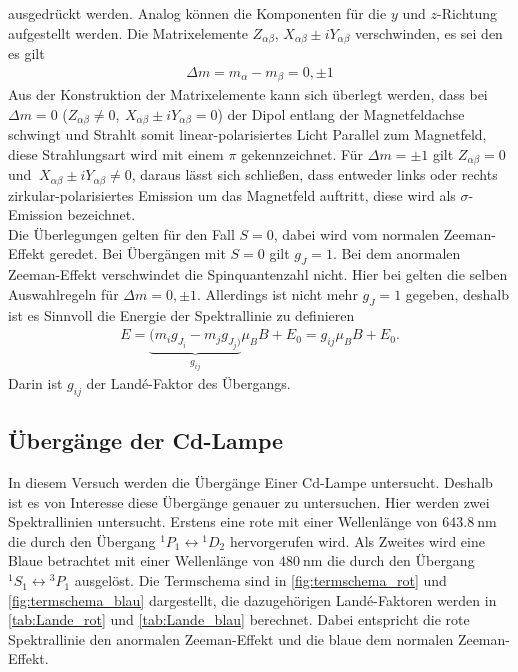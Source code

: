 ausgedrückt werden.
Analog können die Komponenten für die $y$ und $z$-Richtung aufgestellt werden.
Die Matrixelemente $Z_{\alpha\beta}$, $X_{\alpha\beta}\pm i Y_{\alpha\beta}$ verschwinden, es sei den es gilt
\begin{align}
	\Delta m = m_\alpha-m_\beta = 0,\pm1
\end{align}
Aus der Konstruktion der Matrixelemente kann sich überlegt werden, dass bei $\Delta m=0$ ($Z_{\alpha\beta}\not=0,\ X_{\alpha\beta}\pm i Y_{\alpha\beta}=0$) der Dipol entlang der Magnetfeldachse schwingt und Strahlt somit linear-polarisiertes Licht Parallel zum Magnetfeld, diese Strahlungsart wird mit einem $\pi$ gekennzeichnet.
Für $\Delta m =\pm1$ gilt $Z_{\alpha\beta}=0$ und $\ X_{\alpha\beta}\pm i Y_{\alpha\beta}\not=0$, daraus lässt sich schließen, dass entweder links oder rechts zirkular-polarisiertes Emission um das Magnetfeld auftritt, diese wird als $\sigma$-Emission bezeichnet.\\
Die Überlegungen gelten für den Fall $S=0$, dabei wird vom normalen Zeeman-Effekt geredet.
Bei Übergängen mit $S=0$ gilt $g_J=1$.
Bei dem anormalen Zeeman-Effekt verschwindet die Spinquantenzahl nicht.
Hier bei gelten die selben Auswahlregeln für $\Delta m=0,\pm1$.
Allerdings ist nicht mehr $g_J=1$ gegeben, deshalb ist es Sinnvoll die Energie der Spektrallinie zu definieren
\begin{align}
	E=\underbrace{(m_ig_{J_i}-m_jg_{J_j)}}_{g_{ij}}\mu_BB+E_0=g_{ij}\mu_BB+E_0.
\end{align}
Darin ist $g_{ij}$ der Landé-Faktor des Übergangs.
\subsection{Übergänge der Cd-Lampe}
In diesem Versuch werden die Übergänge Einer Cd-Lampe untersucht.
Deshalb ist es von Interesse diese Übergänge genauer zu untersuchen.
Hier werden zwei Spektrallinien untersucht.
Erstens eine rote mit einer Wellenlänge von $\SI{643,8}{\nano\meter}$ die durch den Übergang ${}^1P_1\leftrightarrow{}^1D_2$ hervorgerufen wird.
Als Zweites wird eine Blaue betrachtet mit einer Wellenlänge von $\SI{480}{\nano\meter}$ die durch den Übergang ${}^1S_1\leftrightarrow{}^3P_1$ ausgelöst. 
Die Termschema sind in \cref{fig:termschema_rot} und \cref{fig:termschema_blau} dargestellt, die dazugehörigen Landé-Faktoren werden in \cref{tab:Lande_rot} und \cref{tab:Lande_blau} berechnet.
Dabei entspricht die rote Spektrallinie den anormalen Zeeman-Effekt und die blaue dem normalen Zeeman-Effekt.

